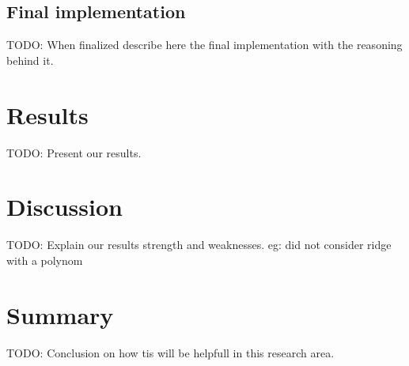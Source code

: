\documentclass[10pt,conference,compsocconf]{IEEEtran}
\begin{document}
\subsection{Final implementation}

TODO: When finalized describe here the final implementation with the reasoning behind it.

\section{Results}
TODO: Present our results.

\section{Discussion}
TODO: Explain our results strength and weaknesses.
eg: did not consider ridge with a polynom

\section{Summary}
TODO: Conclusion on how tis will be helpfull in this research area.



\end{document}
